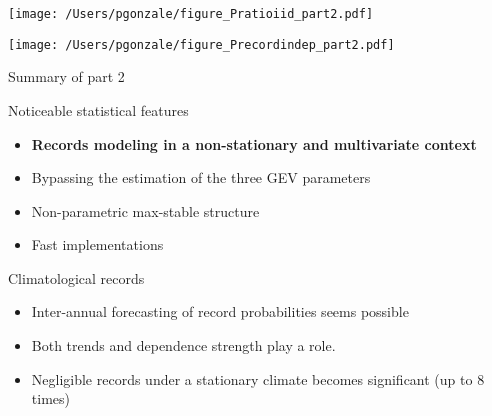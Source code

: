 \documentclass[9pt,compress]{beamer}
\begin{document}
%
%
%
\begin{frame}%
\begin{center}
\texttt{[image: /Users/pgonzale/figure\_Pratioiid\_part2.pdf]}
  \end{center}    
\end{frame}
%
%
%
\begin{frame}%
\begin{center}
\texttt{[image: /Users/pgonzale/figure\_Precordindep\_part2.pdf]}
 \end{center}    
\end{frame} 
\begin{frame}{Summary of part 2}
\begin{block}{Noticeable statistical  features}
 \begin{itemize}
\item {\bf Records modeling in a non-stationary and multivariate context}
\item Bypassing the estimation of the three GEV parameters 
\item Non-parametric max-stable structure
\item Fast implementations 
\end{itemize}
\end{block} 
\begin{block}{Climatological  records}
 \begin{itemize}
\item Inter-annual forecasting  of record probabilities seems possible 
\item  Both trends and dependence strength play a role.  %
\item Negligible records under a stationary climate becomes significant (up to 8 times)
\end{itemize}
\end{block} 
\end{frame}
%
%
%

%
%
%
\end{document}
